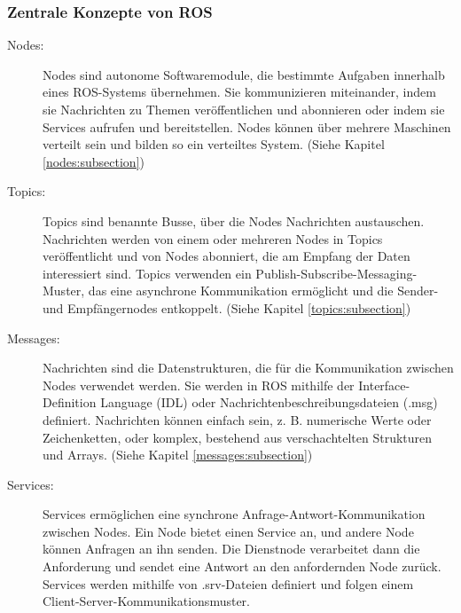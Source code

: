 \subsubsection{Zentrale Konzepte von ROS} \label{zentrale_konzepte:subsubsection}
\begin{description}
    \item[Nodes:] Nodes sind autonome Softwaremodule, die bestimmte Aufgaben innerhalb eines ROS-Systems übernehmen. Sie kommunizieren miteinander, indem sie Nachrichten zu Themen veröffentlichen und abonnieren oder indem sie Services aufrufen und bereitstellen. Nodes können über mehrere Maschinen verteilt sein und bilden so ein verteiltes System. (Siehe Kapitel \ref{nodes:subsection})
    
    \item[Topics:] Topics sind benannte Busse, über die Nodes Nachrichten austauschen. Nachrichten werden von einem oder mehreren Nodes in Topics veröffentlicht und von Nodes abonniert, die am Empfang der Daten interessiert sind. Topics verwenden ein Publish-Subscribe-Messaging-Muster, das eine asynchrone Kommunikation ermöglicht und die Sender- und Empfängernodes entkoppelt. (Siehe Kapitel \ref{topics:subsection})
    
    \item[Messages:] Nachrichten sind die Datenstrukturen, die für die Kommunikation zwischen Nodes verwendet werden. Sie werden in ROS mithilfe der Interface-Definition Language (IDL) oder Nachrichtenbeschreibungsdateien (.msg) definiert. Nachrichten können einfach sein, z. B. numerische Werte oder Zeichenketten, oder komplex, bestehend aus verschachtelten Strukturen und Arrays. (Siehe Kapitel \ref{messages:subsection})
    
    \item[Services:] Services ermöglichen eine synchrone Anfrage-Antwort-Kommunikation zwischen Nodes. Ein Node bietet einen Service an, und andere Node können Anfragen an ihn senden. Die Dienstnode verarbeitet dann die Anforderung und sendet eine Antwort an den anfordernden Node zurück. Services werden mithilfe von .srv-Dateien definiert und folgen einem Client-Server-Kommunikationsmuster.
\end{description}

